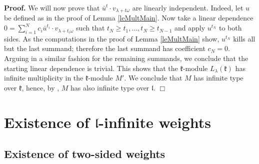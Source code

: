 \documentclass[12pt]{report}
\newenvironment{proof}[1][]{ \textbf{Proof#1. }}{$\Box$\medskip}
\newcommand{\kk}{\mathfrak{k}}
\newcommand{\lL}{\mathfrak{l}}
\newcommand{\refle}[1]{Lemma \ref{#1}}
\newcommand{\sL}{\mathrm{sl}}
\begin{document}
\begin{proof}
We will now prove that $\bar u^t\cdot v_{\lambda+t\omega}$ are linearly independent. Indeed, let $u$ be defined as in the proof of \refle{leMultMain}. Now take a linear dependence $0=\sum_{i=1}^N c_i \bar u^{t_i}\cdot v_{\lambda+t_i\omega}$ such that $t_N\geq t_1, \dots, t_N\geq  t_{N-1}$ and apply $u^{t_N}$ to both sides. As the computations in the proof of \refle{leMultMain} show, $u^{t_N}$ kills all but the last summand; therefore the last summand has coefficient $c_N=0$. Arguing in a similar fashion for the remaining summands, we conclude that the starting linear dependence is trivial. This shows that the $\kk$-module $L_{\lambda }( \kk )$ has infinite multiplicity in the $\kk$-module $M'$. We conclude that $M$ has infinite type over $\kk$, hence, by \cite[Theorem 3.1]{PSZ}, $M$ has also infinite type over $\lL$. 
\end{proof}

\section{Existence of $\lL$-infinite weights}\label{secBigTedious}
\subsection{Existence of two-sided weights}\label{secTwoSided}
\end{document}
